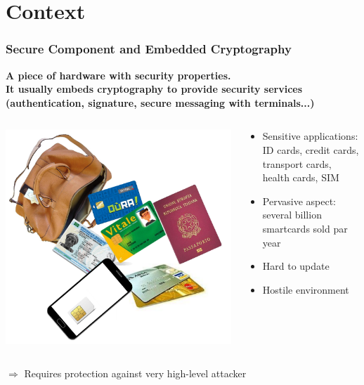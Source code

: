 \section{Context}


\begin{frame}
\frametitle{Secure Component and Embedded Cryptography}
\textbf{A piece of hardware with security properties.}\\
\textbf{It usually embeds cryptography to provide security services (authentication, signature, secure messaging with terminals...)}
\pause
\begin{columns}
\begin{column}{0.5\textwidth}
\includegraphics[width = \textwidth]{figures/smartcards.pdf}
\end{column}
\begin{column}{0.5\textwidth}
\begin{itemize}
\item Sensitive applications: ID cards, credit cards, transport cards, health cards, SIM
\item Pervasive aspect: several billion smartcards sold par year
\item Hard to update
\item Hostile environment
\end{itemize}
\end{column}
\end{columns}
$\Rightarrow$ Requires protection against very high-level attacker
\end{frame}

